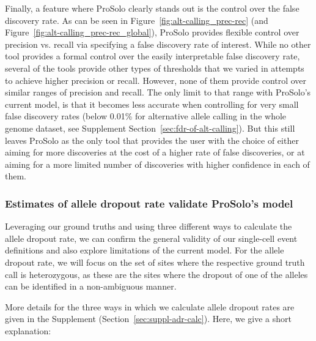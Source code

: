 \documentclass[fleqn,12pt,inline]{wlscirep}
\begin{document}
Finally, a feature where ProSolo clearly stands out is the control over the false discovery rate.
As can be seen in Figure~\ref{fig:alt-calling_prec-rec} (and Figure~\ref{fig:alt-calling_prec-rec_global}), ProSolo provides flexible control over precision vs. recall via specifying a false discovery rate of interest.
While no other tool provides a formal control over the easily interpretable false discovery rate, several of the tools provide other types of thresholds that we varied in attempts to achieve higher precision or recall.
However, none of them provide control over similar ranges of precision and recall.
The only limit to that range with ProSolo's current model, is that it becomes less accurate when controlling for very small false discovery rates (below 0.01\% for alternative allele calling in the whole genome dataset, see Supplement Section~\ref{sec:fdr-of-alt-calling}).
But this still leaves ProSolo as the only tool that provides the user with the choice of either aiming for more discoveries at the cost of a higher rate of false discoveries, or at aiming for a more limited number of discoveries with higher confidence in each of them.

\subsubsection{Estimates of allele dropout rate validate ProSolo's model}

Leveraging our ground truths and using three different ways to calculate the allele dropout rate, we can confirm the general validity of our single-cell event definitions and also explore limitations of the current model.
For the allele dropout rate, we will focus on the set of sites where the respective ground truth call is heterozygous, as these are the sites where the dropout of one of the alleles can be identified in a non-ambiguous manner.

More details for the three ways in which we calculate allele dropout rates are given in the Supplement (Section~\ref{sec:suppl-adr-calc}).
Here, we give a short explanation:
\end{document}
